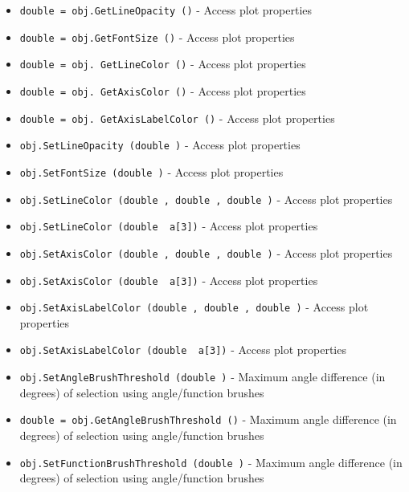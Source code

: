 \begin{itemize}
\item  \verb|double = obj.GetLineOpacity ()| -  Access plot properties

\item  \verb|double = obj.GetFontSize ()| -  Access plot properties

\item  \verb|double = obj. GetLineColor ()| -  Access plot properties

\item  \verb|double = obj. GetAxisColor ()| -  Access plot properties

\item  \verb|double = obj. GetAxisLabelColor ()| -  Access plot properties

\item  \verb|obj.SetLineOpacity (double )| -  Access plot properties

\item  \verb|obj.SetFontSize (double )| -  Access plot properties

\item  \verb|obj.SetLineColor (double , double , double )| -  Access plot properties

\item  \verb|obj.SetLineColor (double  a[3])| -  Access plot properties

\item  \verb|obj.SetAxisColor (double , double , double )| -  Access plot properties

\item  \verb|obj.SetAxisColor (double  a[3])| -  Access plot properties

\item  \verb|obj.SetAxisLabelColor (double , double , double )| -  Access plot properties

\item  \verb|obj.SetAxisLabelColor (double  a[3])| -  Access plot properties

\item  \verb|obj.SetAngleBrushThreshold (double )| -  Maximum angle difference (in degrees) of selection using angle/function brushes

\item  \verb|double = obj.GetAngleBrushThreshold ()| -  Maximum angle difference (in degrees) of selection using angle/function brushes

\item  \verb|obj.SetFunctionBrushThreshold (double )| -  Maximum angle difference (in degrees) of selection using angle/function brushes


\end{itemize}
